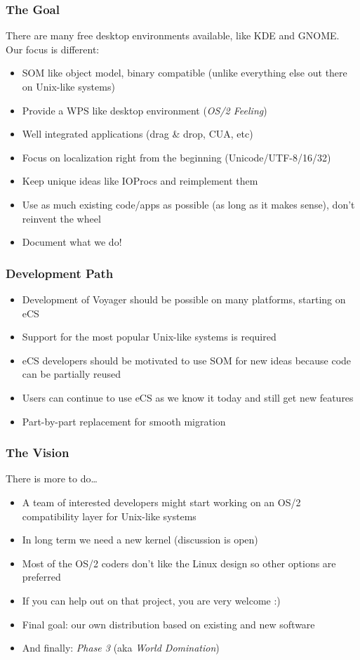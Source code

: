 \documentclass{beamer}
\begin{document}
\begin{frame}
\frametitle{The Goal}
There are many free desktop environments available, like KDE and GNOME. Our focus is different:
\begin{itemize}[<+->]
  \item SOM like object model, binary compatible (unlike everything else out
  there on Unix-like systems)
  \item Provide a WPS like desktop environment (\textit{OS/2 Feeling})
  \item Well integrated applications (drag \& drop, CUA, etc)
  \item Focus on localization right from the beginning (Unicode/UTF-8/16/32)
  \item Keep unique ideas like IOProcs and reimplement them
  \item Use as much existing code/apps as possible (as long as it makes sense),
  don't reinvent the wheel 
  \item Document what we do!
\end{itemize}
\end{frame}

\begin{frame}
\frametitle{Development Path}
\begin{itemize}[<+->]
  \item Development of Voyager should be possible on many platforms, starting on
  eCS
  \item Support for the most popular Unix-like systems is required
  \item eCS developers should be motivated to use SOM for new ideas because
  code can be partially reused
  \item Users can continue to use eCS as we know it today and still get new features
  \item Part-by-part replacement for smooth migration
\end{itemize}
\end{frame}

\begin{frame}
\frametitle{The Vision}
There is more to do\ldots
\begin{itemize}[<+->]
  \item A team of interested developers might start working on an OS/2 compatibility layer for Unix-like systems
  \item In long term we need a new kernel (discussion is open)
  \item Most of the OS/2 coders don't like the Linux design so other options are preferred
  \item If you can help out on that project, you are very welcome :)
  \item Final goal: our own distribution based on existing and new software
  \item And finally: \textit{Phase 3} (aka \textit{World Domination\texttrademark})
\end{itemize}
\end{frame}
\end{document}
